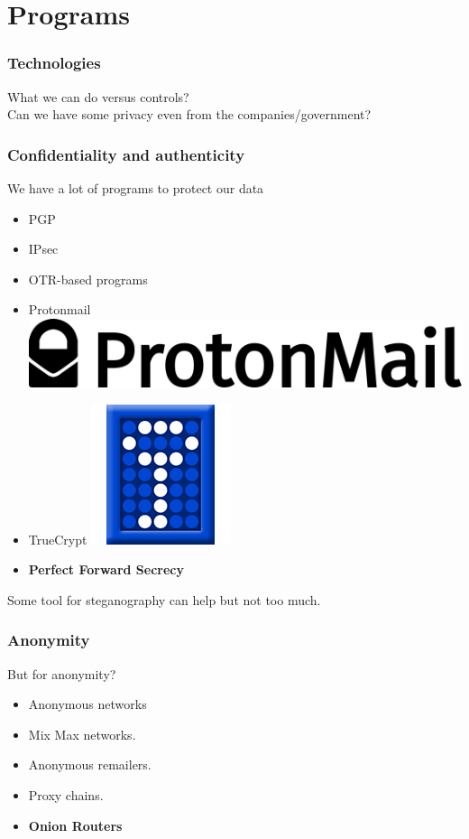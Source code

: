 \section{Programs}
\begin{frame}
	\frametitle{Technologies}
	What we can do versus controls?\\
	Can we have some privacy even from the companies/government?
\end{frame}

\begin{frame}
	\frametitle{Confidentiality and authenticity}
	We have a lot of programs to protect our data
	\begin{itemize}
		\item PGP
		\item IPsec
		\item OTR-based programs
		\item Protonmail \includegraphics[scale=0.017]{imgs/Protonmail_logo}
		\item TrueCrypt \includegraphics[scale=0.1]{imgs/TrueCrypt_Logo}
		\item \textbf{Perfect Forward Secrecy}
	\end{itemize}
	Some tool for steganography can help but not too much.
\end{frame}

\begin{frame}
	\frametitle{Anonymity}
	But for anonymity?
	\begin{itemize}
		\item Anonymous networks
		\item Mix Max networks.
		\item Anonymous remailers.
		\item Proxy chains.
		\item \textbf{Onion Routers}
	\end{itemize}
\end{frame}

